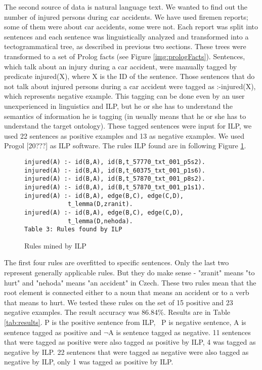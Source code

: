 \documentclass{sig-alternate}
\begin{document}
The second source of data is natural language text. We wanted to find out the number of injured persons during car accidents. We have used firemen reports; some of them were about car accidents, some were not. Each report was split into sentences and each sentence was linguistically analyzed and transformed into a tectogrammatical tree, as described in previous two sections. These trees were transformed to a set of Prolog facts (see Figure \ref{img:prologFacts}). 
Sentences, which talk about an injury during a car accident, were manually tagged by predicate injured(X), where X is the ID of the sentence. Those sentences that do not talk about injured persons during a car accident were tagged as :-injured(X), which represents negative example. This tagging can be done even by an user unexperienced in linguistics and ILP, but he or she has to understand the semantics of information he is tagging (in usually means that he or she has to understand the target ontology).
These tagged sentences were input for ILP, we used 22 sentences as positive examples and 13 as negative examples. We used Progol [20???] as ILP software.
The rules ILP found are in following Figure \ref{img:rules}.

\begin{figure}
{\footnotesize
\begin{verbatim}
injured(A) :- id(B,A), id(B,t_57770_txt_001_p5s2).
injured(A) :- id(B,A), id(B,t_60375_txt_001_p1s6).
injured(A) :- id(B,A), id(B,t_57870_txt_001_p8s2).
injured(A) :- id(B,A), id(B,t_57870_txt_001_p1s1).
injured(A) :- id(B,A), edge(B,C), edge(C,D), 
			t_lemma(D,zranit).
injured(A) :- id(B,A), edge(B,C), edge(C,D), 
			t_lemma(D,nehoda).
Table 3: Rules found by ILP
\end{verbatim}}
\caption{Rules mined by ILP }
\label{img:rules}
\end{figure}

The first four rules are overfitted to specific sentences. Only the last two represent generally applicable rules. But they do make sense - "zranit" means "to hurt" and "nehoda" means "an accident" in Czech. These two rules mean that the root element is connected either to a noun that means an accident or to a verb that means to hurt.
We tested these rules on the set of 15 positive and 23 negative examples. The result accuracy was 86.84\%. Results are in Table \ref{tab:results}. P is the positive sentence from ILP, ~P is negative sentence, A is sentence tagged as positive and $\neg$A is sentence tagged as negative. 11 sentences that were tagged as positive were also tagged as positive by ILP, 4 was tagged as negative by ILP. 22 sentences that were tagged as negative were also tagged as negative by ILP, only 1 was tagged as positive by ILP.
\end{document}
